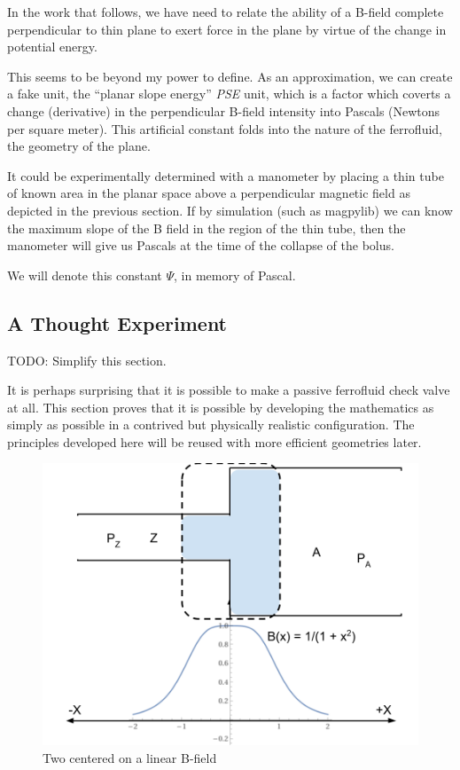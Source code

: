 \documentclass{asme2ej}
\begin{document}
In the work that follows, we have need to relate the ability
of a B-field complete perpendicular to thin plane to exert
force in the plane by virtue of the change in potential energy.

This seems to be beyond my power to define.
As an approximation, we can create a fake unit, the
``planar slope energy'' {\em PSE} unit, which is a factor
which coverts a change (derivative) in the perpendicular B-field intensity
into Pascals (Newtons per square meter).
This artificial constant folds into the nature of the
ferrofluid, the geometry of the plane.

It could be experimentally determined with a manometer
by placing a thin tube of known area in the planar
space above a perpendicular magnetic field
as depicted in the previous section.
If by simulation (such as magpylib) we can know the
maximum slope of the B field in the region of the
thin tube, then the manometer will give us Pascals
at the time of the collapse of the bolus.

We will denote this constant $\Psi$, in memory of Pascal.



\subsection{ A Thought Experiment }

TODO: Simplify this section.

It is perhaps surprising that it is possible to make a
passive ferrofluid check valve at all.
This section proves that it is possible by developing
the mathematics as simply as possible in a contrived
but physically realistic configuration.
The principles developed here will be reused with
more efficient geometries later.



\begin{figure}
\centerline{\includegraphics[width=6in]{figure/ThoughtExperimentCentered.png}}
\caption{Two centered on a  linear B-field}
\label{fig:centeredthought}
\end{figure}
\end{document}
